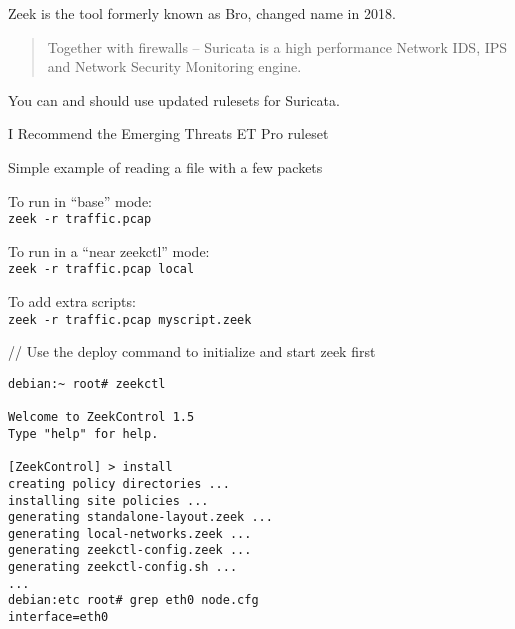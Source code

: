 \documentclass[Screen16to9,17pt]{foils}
\begin{document}
Zeek is the tool formerly known as Bro, changed name in 2018. 




\begin{quote}
Together with firewalls -- Suricata is a high performance Network IDS, IPS and Network Security Monitoring engine.
\end{quote}






You can and should use updated rulesets for Suricata.

I Recommend the Emerging Threats ET Pro ruleset





Simple example of reading a file with a few packets

\begin{list2}
\item
\end{list2}




\begin{list2}
\item To run in “base” mode:\\
 \verb+zeek -r traffic.pcap+
\item To run in a “near zeekctl” mode:\\
\verb+zeek -r traffic.pcap local+
\item To add extra scripts:\\
\verb+zeek -r traffic.pcap myscript.zeek+
\end{list2}



// Use the deploy command to initialize and start zeek first
\begin{verbatim}
debian:~ root# zeekctl

Welcome to ZeekControl 1.5
Type "help" for help.

[ZeekControl] > install
creating policy directories ...
installing site policies ...
generating standalone-layout.zeek ...
generating local-networks.zeek ...
generating zeekctl-config.zeek ...
generating zeekctl-config.sh ...
...
debian:etc root# grep eth0 node.cfg
interface=eth0
\end{verbatim}
\end{document}
